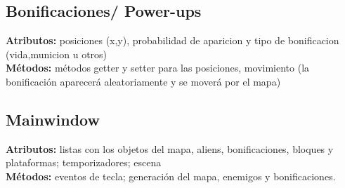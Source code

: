 \documentclass{article}
\begin{document}
\subsection{Bonificaciones/ Power-ups}
\noindent\textbf{Atributos:} posiciones (x,y), probabilidad de aparicion y tipo de bonificacion (vida,municion u otros)\\
\textbf{Métodos:} métodos getter y setter para las posiciones, movimiento (la bonificación aparecerá aleatoriamente y se moverá por el mapa)

\subsection{Mainwindow}
\noindent\textbf{Atributos:} listas con los objetos del mapa, aliens, bonificaciones, bloques y plataformas; temporizadores; escena\\
\textbf{Métodos:} eventos de tecla; generación del mapa, enemigos y bonificaciones.
\end{document}
